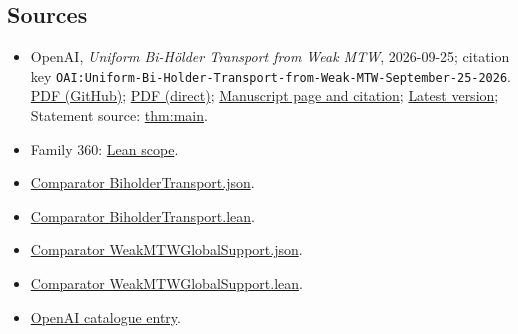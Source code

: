 \documentclass[11pt]{article}
\begin{document}
\subsection{Sources}
\begin{itemize}
\item OpenAI, \emph{Uniform Bi-Hölder Transport from Weak MTW}, 2026-09-25; citation key \texttt{OAI:Uniform-Bi-Holder-Transport-from-Weak-MTW-September-25-2026}. \href{https://github.com/openai/math/blob/adc7f1241b42e322a6451854ab7e4b4c146bf78a/preprints/Uniform-Bi-Holder-Transport-from-Weak-MTW-September-25-2026/paper.pdf}{PDF (GitHub)}; \href{https://github.com/openai/math/raw/adc7f1241b42e322a6451854ab7e4b4c146bf78a/preprints/Uniform-Bi-Holder-Transport-from-Weak-MTW-September-25-2026/paper.pdf}{PDF (direct)}; \href{https://github.com/openai/math/blob/adc7f1241b42e322a6451854ab7e4b4c146bf78a/preprints/Uniform-Bi-Holder-Transport-from-Weak-MTW-September-25-2026/README.md}{Manuscript page and citation}; \href{https://github.com/openai/math/blob/main/preprints/Uniform-Bi-Holder-Transport-from-Weak-MTW-September-25-2026/paper.pdf}{Latest version}; Statement source: \href{https://github.com/openai/math/blob/adc7f1241b42e322a6451854ab7e4b4c146bf78a/preprints/Uniform-Bi-Holder-Transport-from-Weak-MTW-September-25-2026/build/sections/introduction.tex\#L32}{thm:main}.
\item Family 360: \href{https://github.com/openai/math/blob/adc7f1241b42e322a6451854ab7e4b4c146bf78a/lean/docs/360.md}{Lean scope}.
\item \href{https://github.com/openai/math/blob/adc7f1241b42e322a6451854ab7e4b4c146bf78a/lean/ComparatorChallenges/BiholderTransport.json}{Comparator BiholderTransport.json}.
\item \href{https://github.com/openai/math/blob/adc7f1241b42e322a6451854ab7e4b4c146bf78a/lean/ComparatorChallenges/BiholderTransport.lean}{Comparator BiholderTransport.lean}.
\item \href{https://github.com/openai/math/blob/adc7f1241b42e322a6451854ab7e4b4c146bf78a/lean/ComparatorChallenges/WeakMTWGlobalSupport.json}{Comparator WeakMTWGlobalSupport.json}.
\item \href{https://github.com/openai/math/blob/adc7f1241b42e322a6451854ab7e4b4c146bf78a/lean/ComparatorChallenges/WeakMTWGlobalSupport.lean}{Comparator WeakMTWGlobalSupport.lean}.
\item \href{https://github.com/openai/math/blob/adc7f1241b42e322a6451854ab7e4b4c146bf78a/CONTENTS.md}{OpenAI catalogue entry}.
\end{itemize}
\end{document}
